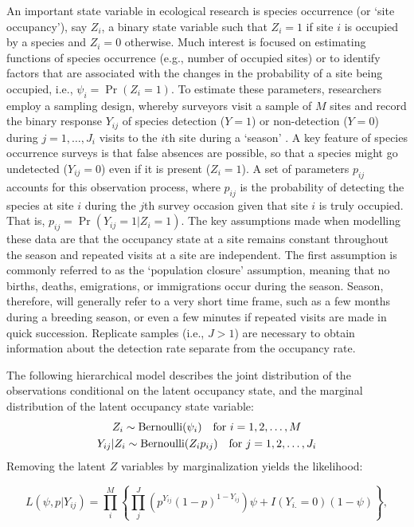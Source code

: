 \documentclass[article,shortnames]{jss}
\DeclareMathOperator{\Bern}{Bernoulli}
\begin{document}
An important state variable in ecological research is species occurrence 
(or `site occupancy'), say $Z_{i}$, a binary state variable such that 
$Z_{i}=1$ if site $i$ is occupied by a species and $Z_{i}=0$ otherwise.
Much interest is focused on estimating functions of species occurrence 
(e.g., number of occupied sites) or to identify factors that are
associated with the changes in the probability of a site being
occupied, i.e., $\psi_{i}  = \Pr(Z_{i}=1)$. To estimate these parameters, 
researchers employ a sampling design, whereby surveyors visit a sample of $M$
sites and record the binary response $Y_{ij}$ of species detection ($Y=1$) or
non-detection ($Y=0$) during $j=1,\ldots,J_{i}$ visits to the $i$th site 
during a `season' \citep{MacKenzie2002}.  
A key feature of species occurrence surveys is that false absences are 
possible, so that a species might go undetected ($Y_{ij} =0$) even if it is 
present ($Z_{i} = 1$). A set of parameters $p_{ij}$ accounts for this 
observation process, where $p_{ij}$ is the
probability of detecting the species at site $i$ during the $j$th
survey occasion given that site $i$ is truly occupied.  That is, 
$p_{ij} = \Pr(Y_{ij} = 1|Z_{i} = 1)$.
The key assumptions made
when modelling these data are that the occupancy state at a site 
remains constant throughout the season and repeated visits at
a site are independent.  The first assumption is commonly referred to as the
`population closure' assumption, meaning that no births, deaths, emigrations,
or immigrations occur during the season.  
Season, therefore, will generally refer to a very short time frame, such as 
a few months during a breeding season, or even a few minutes if repeated 
visits are made in quick succession.  Replicate samples (i.e., $J>1$) are 
necessary to obtain information about the detection rate separate from 
the occupancy rate.  

The following hierarchical model describes the joint distribution of the 
observations conditional on the latent occupancy state, and the marginal 
distribution of the latent occupancy state variable:
\begin{gather}
Z_i \sim \Bern(\psi_i) \text{\quad for $i=1,2,\dots,M$} \notag \\
Y_{ij}|Z_i \sim \Bern(Z_i p_{ij})\text{\quad for $j=1,2,\dots,J_{i}$} \notag
\end{gather}
Removing the latent $Z$ variables by marginalization yields the likelihood:

\begin{equation}
L(\psi, p | Y_{ij}) = 
 \prod_{i}^{M} \left\{
    \prod_{j}^{J} 
      \left(p^{Y_{ij}}(1-p)^{1-Y_{ij}}\right)
          \psi + I(Y_{i.}=0)(1-\psi) \right\},  
\end{equation}
\end{document}

